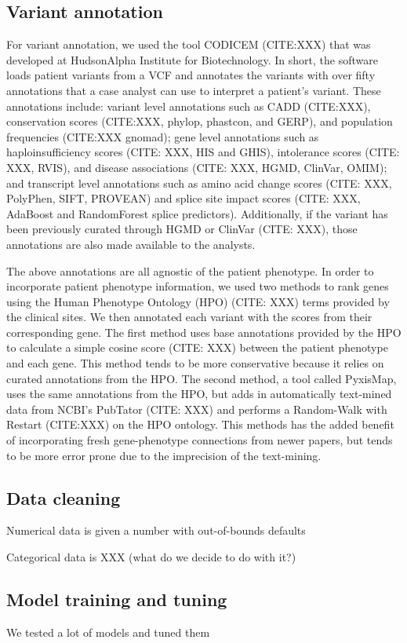 \documentclass{bioinfo}
\begin{document}
\begin{methods}
\subsection{Variant annotation}
For variant annotation, we used the tool CODICEM (CITE:XXX) that was developed at HudsonAlpha Institute for Biotechnology.  In short, the software loads patient variants from a VCF and annotates the variants with over fifty annotations that a case analyst can use to interpret a patient's variant.  These annotations include: variant level annotations such as CADD (CITE:XXX), conservation scores (CITE:XXX, phylop, phastcon, and GERP), and population frequencies (CITE:XXX gnomad); gene level annotations such as haploinsufficiency scores (CITE: XXX, HIS and GHIS), intolerance scores (CITE: XXX, RVIS), and disease associations (CITE: XXX, HGMD, ClinVar, OMIM); and transcript level annotations such as amino acid change scores (CITE: XXX, PolyPhen, SIFT, PROVEAN) and splice site impact scores (CITE: XXX, AdaBoost and RandomForest splice predictors).  Additionally, if the variant has been previously curated through HGMD or ClinVar (CITE: XXX), those annotations are also made available to the analysts.

The above annotations are all agnostic of the patient phenotype.  In order to incorporate patient phenotype information, we used two methods to rank genes using the Human Phenotype Ontology (HPO) (CITE: XXX) terms provided by the clinical sites.  We then annotated each variant with the scores from their corresponding gene.  The first method uses base annotations provided by the HPO to calculate a simple cosine score (CITE: XXX) between the patient phenotype and each gene.  This method tends to be more conservative because it relies on curated annotations from the HPO.  The second method, a tool called PyxisMap, uses the same annotations from the HPO, but adds in automatically text-mined data from NCBI's PubTator (CITE: XXX) and performs a Random-Walk with Restart (CITE:XXX) on the HPO ontology.  This methods has the added benefit of incorporating fresh gene-phenotype connections from newer papers, but tends to be more error prone due to the imprecision of the text-mining.

\subsection{Data cleaning}
Numerical data is given a number with out-of-bounds defaults

Categorical data is XXX (what do we decide to do with it?)

\subsection{Model training and tuning}

We tested a lot of models and tuned them

\end{methods}
\end{document}
